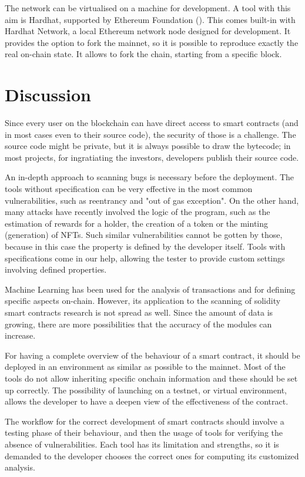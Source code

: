 \documentclass[a4paper,sigconf, language=french,
language=german, language=spanish, language=english]{acmart}
\begin{document}
The network can be virtualised on a machine for development. A tool with this aim is Hardhat, supported by Ethereum Foundation (\cite{HardhatDoc}). This comes built-in with Hardhat Network, a local Ethereum network node designed for development. It provides the option to fork the mainnet, so it is possible to reproduce exactly the real on-chain state. It allows to fork the chain, starting from a specific block.

\section{Discussion}
\label{Discussion}

Since every user on the blockchain can have direct access to smart contracts (and in most cases even to their source code), the security of those is a challenge. The source code might be private, but it is always possible to draw the bytecode; in most projects, for ingratiating the investors, developers publish their source code.

An in-depth approach to scanning bugs is necessary before the deployment. The tools without specification can be very effective in the most common vulnerabilities, such as reentrancy and "out of gas exception". On the other hand, many attacks have recently involved the logic of the program, such as the estimation of rewards for a holder, the creation of a token or the minting (generation) of NFTs. Such similar vulnerabilities cannot be gotten by those, because in this case the property is defined by the developer itself. Tools with specifications come in our help, allowing the tester to provide custom settings involving defined properties.

Machine Learning has been used for the analysis of transactions and for defining specific aspects on-chain. However, its application to the scanning of solidity smart contracts research is not spread as well. Since the amount of data is growing, there are more possibilities that the accuracy of the modules can increase. 

For having a complete overview of the behaviour of a smart contract, it should be deployed in an environment as similar as possible to the mainnet. Most of the tools do not allow inheriting specific onchain information and these should be set up correctly.
The possibility of launching on a testnet, or virtual environment, allows the developer to have a deepen view of the effectiveness of the contract.

The workflow for the correct development of smart contracts should involve a testing phase of their behaviour, and then the usage of tools for verifying the absence of vulnerabilities. Each tool has its limitation and strengths, so it is demanded to the developer chooses the correct ones for computing its customized analysis.
\end{document}
